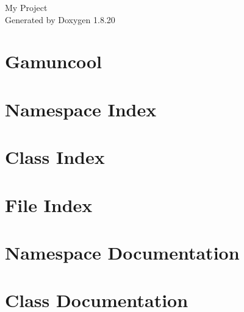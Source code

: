 \let\mypdfximage\pdfximage\def\pdfximage{\immediate\mypdfximage}\documentclass[twoside]{book}
\newcommand{\+}{\discretionary{\mbox{\scriptsize$\hookleftarrow$}}{}{}}
\newcommand{\clearemptydoublepage}{%
  \newpage{\pagestyle{empty}\cleardoublepage}%
}
\begin{document}
\hypersetup{pageanchor=false,
             bookmarksnumbered=true,
             pdfencoding=unicode
            }
\begin{titlepage}
\vspace*{7cm}
\begin{center}%
{\Large My Project }\\
\vspace*{1cm}
{\large Generated by Doxygen 1.8.20}\\
\end{center}
\end{titlepage}
\clearemptydoublepage
{}
\tableofcontents
\clearemptydoublepage
{}
\hypersetup{pageanchor=true}

\chapter{Gamuncool}
\label{md__r_e_a_d_m_e}

\chapter{Namespace Index}

\chapter{Class Index}

\chapter{File Index}

\chapter{Namespace Documentation}


\chapter{Class Documentation}











































\end{document}
